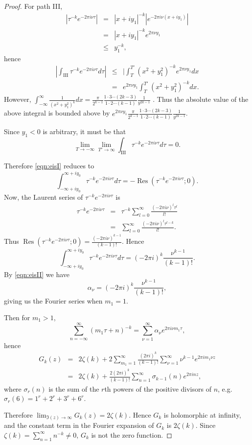 \documentclass{article}
\DeclareMathOperator{\Res}{Res}
\begin{document}
\begin{proof}
For path III,
\begin{eqnarray*}
|\tau^{-k}e^{-2\pi i\nu \tau}|&=&|x+iy_1|^{-k}|e^{-2\pi i\nu(x+iy_1)}|\\
&=&|x+iy_1|^{-k}e^{2\pi \nu y_1}\\
&\leq&y_1^{-k},
\end{eqnarray*}
hence
\begin{eqnarray*}
|\int_{\textrm{III}} \tau^{-k}e^{-2\pi i\nu \tau}d\tau|&\leq&|\int_T^{T'} (x^2+y_1^2)^{-k} e^{2\pi \nu y_1}dx\\
&=&e^{2\pi \nu y_1} \int_T^{T'} (x^2+y_1^2)^{-k} dx.
\end{eqnarray*}
However, $\int_{-\infty}^\infty \frac{1}{(x^2+y_1^2)^k} dx=\frac{\pi}{2^{k-1}} \frac{1\cdot 3\cdots (2k-3)}{1\cdot 2\cdots (k-1)} \frac{1}{y^{2k-1}}$ \cite[Chapter XV, \S 2, K7]{MR1659317}.
Thus the absolute value of the above integral is bounded above 
by $e^{2\pi \nu y_1}\frac{\pi}{2^{k-1}} \frac{1\cdot 3\cdots (2k-3)}{1\cdot 2\cdots (k-1)} \frac{1}{y^{2k-1}}$.

Since $y_1<0$ is arbitrary, it must be that
\[
\lim_{T \to -\infty} \lim_{T' \to \infty} \int_{\textrm{III}} \tau^{-k}e^{-2\pi i\nu \tau}d\tau=0.
\]

Therefore \eqref{eqn:eisI} reduces to
\[
\int_{-\infty+iy_0}^{\infty+iy_0} \tau^{-k}e^{-2\pi i\nu \tau}d\tau=-\Res(\tau^{-k}e^{-2\pi i\nu \tau};0).
\]
Now, the Laurent series of $\tau^{-k}e^{-2\pi i\nu \tau}$ is
\begin{eqnarray*}
\tau^{-k}e^{-2\pi i\nu \tau}&=&\tau^{-k} \sum_{l=0}^\infty \frac{(-2\pi i\nu)^l \tau^l}{l!}\\
&=&\sum_{l=0}^\infty \frac{(-2\pi i\nu)^l \tau^{l-k}}{l!}.
\end{eqnarray*}
Thus $\Res(\tau^{-k}e^{-2\pi i\nu \tau};0)=\frac{(-2\pi i\nu)^{k-1}}{(k-1)!}$.
Hence
\[
\int_{-\infty+iy_0}^{\infty+iy_0} \tau^{-k}e^{-2\pi i\nu \tau}d\tau=(-2\pi i)^k \frac{\nu^{k-1}}{(k-1)!}.
\]
By \eqref{eqn:eisII} we have
\[
\alpha_\nu=(-2\pi i)^k \frac{\nu^{k-1}}{(k-1)!},
\]
giving us the Fourier series when $m_1=1$.

Then for $m_1>1$,
\[
\sum_{n=-\infty}^\infty (m_1\tau+n)^{-k}=\sum_{\nu=1}^\infty \alpha_\nu e^{2\pi i\nu m_1\tau},
\]
hence
\begin{eqnarray}
\nonumber
G_k(z)&=&2\zeta(k)+2\sum_{m_1=1}^\infty \frac{(2\pi i)^k}{(k-1)!} \sum_{\nu=1}^\infty \nu^{k-1} e^{2\pi im_1 \nu z}\\
&=&2\zeta(k)+\frac{2(2\pi i)^k}{(k-1)!} \sum_{n=1}^\infty \sigma_{k-1}(n)e^{2\pi i nz}\label{eqn:Gfourier},
\end{eqnarray}
where $\sigma_r(n)$ is the sum of the $r$th powers of the positive divisors of $n$, e.g. $\sigma_r(6)=1^r+2^r+3^r+6^r$.

Therefore $\lim_{\Im(z) \to \infty} G_k(z)= 2\zeta(k)$. Hence
$G_k$ is holomorphic at infinity, and the constant term in the Fourier expansion of $G_k$ is $2\zeta(k)$. Since $\zeta(k)=\sum_{n=1}^\infty n^{-k} \neq 0$, $G_k$ is not the zero function.
\end{proof}
\end{document}
